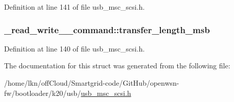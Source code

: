 Definition at line 141 of file usb\+\_\+msc\+\_\+scsi.\+h.

\subsubsection[{\texorpdfstring{transfer\+\_\+length\+\_\+msb}{transfer_length_msb}}]{ \+\_\+read\+\_\+write\+\_\+\_\+command\+::transfer\+\_\+length\+\_\+msb}\hypertarget{struct__read__write__10__command_a39c3facff5ffc432a58fad8154a3765e}{}\label{struct__read__write__10__command_a39c3facff5ffc432a58fad8154a3765e}


Definition at line 140 of file usb\+\_\+msc\+\_\+scsi.\+h.



The documentation for this struct was generated from the following file\+:\begin{DoxyCompactItemize}
\item 
/home/lkn/off\+Cloud/\+Smartgrid-\/code/\+Git\+Hub/openwsn-\/fw/bootloader/k20/usb/\hyperlink{usb__msc__scsi_8h}{usb\+\_\+msc\+\_\+scsi.\+h}\end{DoxyCompactItemize}
